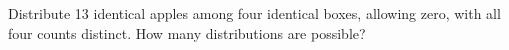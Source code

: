 Distribute 13 identical apples among four identical boxes, allowing zero, with all four counts distinct. How many distributions are possible?
